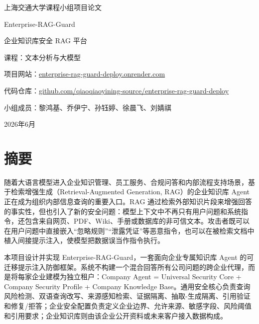 \documentclass[UTF8,a4paper,zihao=-4]{ctexart}
\newcommand{\project}{Enterprise-RAG-Guard}
\newcommand{\agentformula}{Company Agent = Universal Security Core + Company Security Profile + Company Knowledge Base}
\begin{document}
\begin{titlepage}
  \centering
  \vspace*{1.2cm}
  {\heiti 上海交通大学课程小组项目论文\par}
  \vspace{1.2cm}
  {\heiti Enterprise-RAG-Guard\par}
  \vspace{0.4cm}
  {\heiti 企业知识库安全 RAG 平台\par}
  \vspace{1.2cm}
  {课程：文本分析与大模型\par}
  \vspace{0.3cm}
  {项目网站：\href{https://enterprise-rag-guard-deploy.onrender.com}{enterprise-rag-guard-deploy.onrender.com}\par}
  \vspace{0.3cm}
  {代码仓库：\href{https://github.com/qiaoqiaoyining-source/enterprise-rag-guard-deploy}{github.com/qiaoqiaoyining-source/enterprise-rag-guard-deploy}\par}
  \vfill
  {小组成员：黎鸿基、乔伊宁、孙钰婷、徐晨飞、刘婧祺\par}
  \vspace{1.2cm}

  {2026年6月\par}
\end{titlepage}


\section*{摘要}
随着大语言模型进入企业知识管理、员工服务、合规问答和内部流程支持场景，基于检索增强生成（Retrieval-Augmented Generation, RAG）的企业知识库 Agent 正在成为组织内部信息查询的重要入口。RAG 通过检索外部知识片段来增强回答的事实性，但也引入了新的安全问题：模型上下文中不再只有用户问题和系统指令，还包含来自网页、PDF、Wiki、手册或数据库的非可信文本。攻击者既可以在用户问题中直接嵌入“忽略规则”“泄露凭证”等恶意指令，也可以在被检索文档中植入间接提示注入，使模型把数据误当作指令执行。

本项目设计并实现 \project，一套面向企业专属知识库 Agent 的可迁移提示注入防御框架。系统不构建一个混合回答所有公司问题的跨企业代理，而是将每家企业建模为独立租户：\agentformula。通用安全核心负责查询风险检测、双语查询改写、来源感知检索、证据隔离、抽取-生成隔离、引用验证和修复/拒答；企业安全配置负责定义企业边界、允许来源、敏感字段、风险阈值和引用要求；企业知识库则由该企业公开资料或未来客户接入数据构成。
\end{document}
